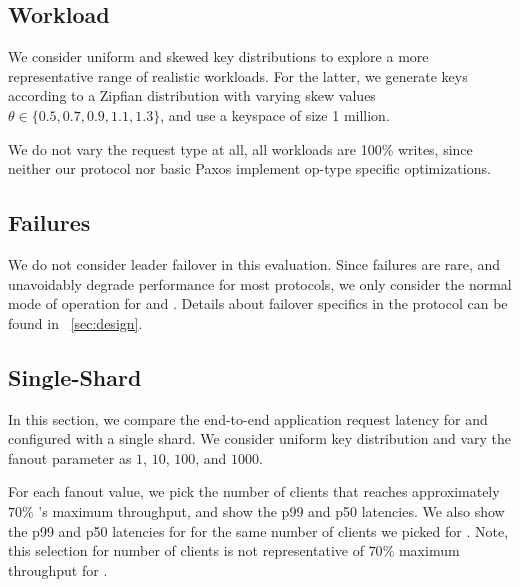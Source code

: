 

\subsection{Workload}
We consider uniform and skewed key distributions to explore a more representative range of realistic workloads. For the latter, we generate keys according to a Zipfian distribution with varying skew values $\theta \in \{0.5, 0.7, 0.9, 1.1, 1.3\}$, and use a keyspace of size 1 million. 

We do not vary the request type at all, all workloads are 100\% writes, since neither our protocol nor basic Paxos implement op-type specific optimizations. 

\subsection{Failures}
We do not consider leader failover in this evaluation. Since failures are rare, and unavoidably degrade performance for most protocols, we only consider the normal mode of operation for \system and \mpaxos. Details about failover specifics in the protocol can be found in ~\ref{sec:design}.

\subsection{Single-Shard}
In this section, we compare the end-to-end application request latency for \system and \mpaxos configured with a single shard. We consider uniform key distribution and vary the fanout parameter as $1$, $10$, $100$, and $1000$.

For each fanout value, we pick the number of clients that reaches approximately $70\%$ \system's maximum throughput, and show the p99 and p50 latencies. We also show the p99 and p50 latencies for \mpaxos for the same number of clients we picked for \system. Note, this selection for number of clients is not representative of $70\%$ maximum throughput for \mpaxos.

